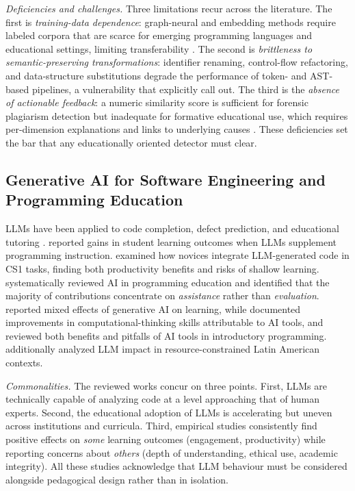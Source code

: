 \documentclass[twocolumn,11pt]{article}
\begin{document}
    \textit{Deficiencies and challenges.} Three limitations recur across the literature. The first is \emph{training-data dependence}: graph-neural and embedding methods require labeled corpora that are scarce for emerging programming languages and educational settings, limiting transferability \citep{zhang2025machine,zakeri2023systematic}. The second is \emph{brittleness to semantic-preserving transformations}: identifier renaming, control-flow refactoring, and data-structure substitutions degrade the performance of token- and AST-based pipelines, a vulnerability that \citet{ebrahim2024semantic} explicitly call out. The third is the \emph{absence of actionable feedback}: a numeric similarity score is sufficient for forensic plagiarism detection but inadequate for formative educational use, which requires per-dimension explanations and links to underlying causes \citep{lee2023review}. These deficiencies set the bar that any educationally oriented detector must clear.
    \subsection{Generative AI for Software Engineering and Programming Education}
    LLMs have been applied to code completion, defect prediction, and educational tutoring \citep{jiang2024survey,vanviet2024large}. \citet{jost2024impact} reported gains in student learning outcomes when LLMs supplement programming instruction. \citet{kazemitabaar2023novices} examined how novices integrate LLM-generated code in CS1 tasks, finding both productivity benefits and risks of shallow learning. \citet{manorat2025artificial} systematically reviewed AI in programming education and identified that the majority of contributions concentrate on \emph{assistance} rather than \emph{evaluation}. \citet{lepp2025does} reported mixed effects of generative AI on learning, while \citet{yilmaz2023effect} documented improvements in computational-thinking skills attributable to AI tools, and \citet{zviel2024good} reviewed both benefits and pitfalls of AI tools in introductory programming. \citet{vera2025impacto} additionally analyzed LLM impact in resource-constrained Latin American contexts.
     
    \textit{Commonalities.} The reviewed works concur on three points. First, LLMs are technically capable of analyzing code at a level approaching that of human experts. Second, the educational adoption of LLMs is accelerating but uneven across institutions and curricula. Third, empirical studies consistently find positive effects on \emph{some} learning outcomes (engagement, productivity) while reporting concerns about \emph{others} (depth of understanding, ethical use, academic integrity). All these studies acknowledge that LLM behaviour must be considered alongside pedagogical design rather than in isolation.
     
\end{document}

